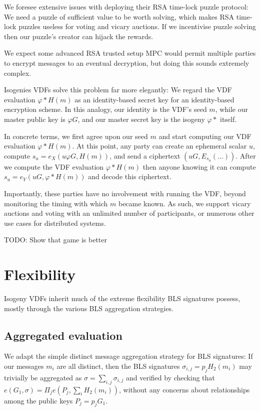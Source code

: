 \documentclass{article}
\begin{document}
We foresee extensive issues with deploying their RSA time-lock puzzle
protocol:
We need a puzzle of sufficient value to be worth solving, which makes
RSA time-lock puzzles useless for voting and vicary auctions. 
If we incentivise puzzle solving then our puzzle's creator can hijack
the rewards.   

We expect some advanced RSA trusted setup MPC would permit multiple
parties to encrypt messages to an eventual decryption, but doing this
sounds extremely complex.

Isogenies VDFs solve this problem far more elegantly:  We regard the
VDF evaluation $φ* H(m)$ as an identity-based secret key for an
identity-based encryption scheme.  In this analogy, our identity is
the VDF's seed $m$, while our master public key is $φ G$, and
our master secret key is the isogeny $φ*$ itself.

In concrete terms, we first agree upon our seed $m$ and start computing
our VDF evaluation $φ* H(m)$.  At this point, any party can create an
ephemeral scalar $u$, compute $s_u = e_X ( u φ G, H(m) )$, and
send a ciphertext $(u G, E_{s_u}(\ldots))$.
After we compute the VDF evaluation $φ* H(m)$ then anyone knowing it
can compute $s_u = e_Y ( u G, φ* H(m) )$ and decode this ciphertext.

Importantly, these parties have no involvement with running the VDF,
beyond monitoring the timing with which $m$ became known.  As such,
we support vicary auctions and voting with an unlimited number of
participants, or numerous other use cases for distributed systems.


TODO: Show that game is better


\section{Flexibility}

Isogeny VDFs inherit much of the extreme flexibility BLS signatures
possess, mostly through the various BLS aggregation strategies.

\subsection{Aggregated evaluation}

We adapt the simple distinct message aggregation strategy for
BLS signatures:  If our messages $m_i$ are all distinct, then the
BLS signatures $\sigma_{i,j} = p_j H_2(m_i)$ may trivially be
aggregated as $\sigma = \sum_{i,j} \sigma_{i,j}$ and verified by
checking that $e(G_1,\sigma) = \Pi_j e(P_j, \sum_i H_2(m_i))$,
without any concerns about relationships among the public keys
$P_j = p_j G_1$.  
\end{document}
